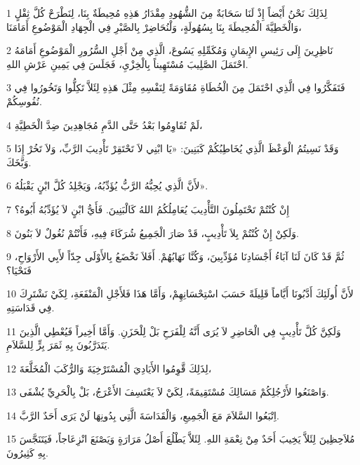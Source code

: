 \par 1 لِذَلِكَ نَحْنُ أَيْضاً إِذْ لَنَا سَحَابَةٌ مِنَ الشُّهُودِ مِقْدَارُ هَذِهِ مُحِيطَةٌ بِنَا، لِنَطْرَحْ كُلَّ ثِقْلٍ وَالْخَطِيَّةَ الْمُحِيطَةَ بِنَا بِسُهُولَةٍ، وَلْنُحَاضِرْ بِالصَّبْرِ فِي الْجِهَادِ الْمَوْضُوعِ أَمَامَنَا،
\par 2 نَاظِرِينَ إِلَى رَئِيسِ الإِيمَانِ وَمُكَمِّلِهِ يَسُوعَ، الَّذِي مِنْ أَجْلِ السُّرُورِ الْمَوْضُوعِ أَمَامَهُ احْتَمَلَ الصَّلِيبَ مُسْتَهِيناً بِالْخِزْيِ، فَجَلَسَ فِي يَمِينِ عَرْشِ اللهِ.
\par 3 فَتَفَكَّرُوا فِي الَّذِي احْتَمَلَ مِنَ الْخُطَاةِ مُقَاوَمَةً لِنَفْسِهِ مِثْلَ هَذِهِ لِئَلاَّ تَكِلُّوا وَتَخُورُوا فِي نُفُوسِكُمْ.
\par 4 لَمْ تُقَاوِمُوا بَعْدُ حَتَّى الدَّمِ مُجَاهِدِينَ ضِدَّ الْخَطِيَّةِ،
\par 5 وَقَدْ نَسِيتُمُ الْوَعْظَ الَّذِي يُخَاطِبُكُمْ كَبَنِينَ: «يَا ابْنِي لاَ تَحْتَقِرْ تَأْدِيبَ الرَّبِّ، وَلاَ تَخُرْ إِذَا وَبَّخَكَ.
\par 6 لأَنَّ الَّذِي يُحِبُّهُ الرَّبُّ يُؤَدِّبُهُ، وَيَجْلِدُ كُلَّ ابْنٍ يَقْبَلُهُ».
\par 7 إِنْ كُنْتُمْ تَحْتَمِلُونَ التَّأْدِيبَ يُعَامِلُكُمُ اللهُ كَالْبَنِينَ. فَأَيُّ ابْنٍ لاَ يُؤَدِّبُهُ أَبُوهُ؟
\par 8 وَلَكِنْ إِنْ كُنْتُمْ بِلاَ تَأْدِيبٍ، قَدْ صَارَ الْجَمِيعُ شُرَكَاءَ فِيهِ، فَأَنْتُمْ نُغُولٌ لاَ بَنُونَ.
\par 9 ثُمَّ قَدْ كَانَ لَنَا آبَاءُ أَجْسَادِنَا مُؤَدِّبِينَ، وَكُنَّا نَهَابُهُمْ. أَفَلاَ نَخْضَعُ بِالأَوْلَى جِدّاً لأَبِي الأَرْوَاحِ، فَنَحْيَا؟
\par 10 لأَنَّ أُولَئِكَ أَدَّبُونَا أَيَّاماً قَلِيلَةً حَسَبَ اسْتِحْسَانِهِمْ، وَأَمَّا هَذَا فَلأَجْلِ الْمَنْفَعَةِ، لِكَيْ نَشْتَرِكَ فِي قَدَاسَتِهِ.
\par 11 وَلَكِنَّ كُلَّ تَأْدِيبٍ فِي الْحَاضِرِ لاَ يُرَى أَنَّهُ لِلْفَرَحِ بَلْ لِلْحَزَنِ. وَأَمَّا أَخِيراً فَيُعْطِي الَّذِينَ يَتَدَرَّبُونَ بِهِ ثَمَرَ بِرٍّ لِلسَّلاَمِ.
\par 12 لِذَلِكَ قَّوِمُوا الأَيَادِيَ الْمُسْتَرْخِيَةَ وَالرُّكَبَ الْمُخَلَّعَةَ،
\par 13 وَاصْنَعُوا لأَرْجُلِكُمْ مَسَالِكَ مُسْتَقِيمَةً، لِكَيْ لاَ يَعْتَسِفَ الأَعْرَجُ، بَلْ بِالْحَرِيِّ يُشْفَى.
\par 14 اِتْبَعُوا السَّلاَمَ مَعَ الْجَمِيعِ، وَالْقَدَاسَةَ الَّتِي بِدُونِهَا لَنْ يَرَى أَحَدٌ الرَّبَّ.
\par 15 مُلاَحِظِينَ لِئَلاَّ يَخِيبَ أَحَدٌ مِنْ نِعْمَةِ اللهِ. لِئَلاَّ يَطْلُعَ أَصْلُ مَرَارَةٍ وَيَصْنَعَ انْزِعَاجاً، فَيَتَنَجَّسَ بِهِ كَثِيرُونَ.
